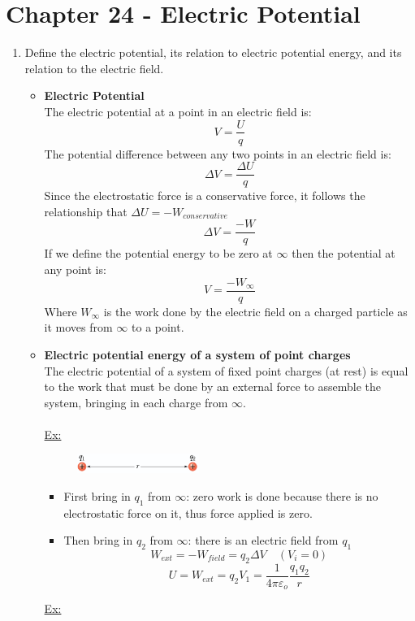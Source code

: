 \documentclass[12pt]{article}
\begin{document}
\section*{Chapter 24 - Electric Potential}
\begin{enumerate}
    \item Define the electric potential, its relation to electric potential energy, and its relation to the electric field.
    \begin{itemize}
\item \textbf{Electric Potential}\\
The electric potential at a point in an electric field is:    
\[\boxed{V=\frac{U}{q}}\]
The potential difference between any two points in an electric field is:
\[\Delta V=\frac{\Delta U}{q}\]
Since the electrostatic force is a conservative force, it follows the relationship that $\Delta U = -W_{conservative}$
\[\boxed{\Delta V = \frac{-W}{q}}\]
If we define the potential energy to be zero at $\infty$ then the potential at any point is:
\[V=\frac{-W_{\infty}}{q}\]
Where $W_{\infty}$ is the work done by the electric field on a charged particle as it moves from $\infty$ to a point.
\item \textbf{Electric potential energy of a system of point charges}\\
The electric potential of a system of fixed point charges (at rest) is equal to the work that must be done by an external force to assemble the system, bringing in each charge from $\infty$.\\\\
\underline{Ex:}
   \begin{figure}[H]
            \centering
            \includegraphics[width=0.4\textwidth]{energy 1.png}
    \end{figure}
\begin{itemize}
    \item First bring in $q_1$ from $\infty$: zero work is done because there is no electrostatic force on it, thus force applied is zero.
    \item Then bring in $q_2$ from $\infty$: there is an electric field from $q_1$
    \[W_{ext}=-W_{field}=q_2 \Delta V \quad (V_i =0)\]
    \[U=W_{ext}=q_2V_1=\frac{1}{4\pi\varepsilon_o}\frac{q_1q_2}{r}\]
\end{itemize} 
\underline{Ex:}
   \begin{figure}[H]

\end{figure}
\end{itemize}
\end{enumerate}
\end{document}
